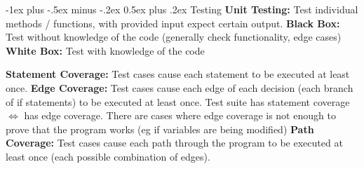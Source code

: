 \documentclass[letterpaper, 8pt]{extarticle}
\makeatletter
\renewcommand{\section}{\@startsection{section}{1}{0mm}%
                                {-1ex plus -.5ex minus -.2ex}%
                                {0.5ex plus .2ex}%
                                {\normalfont\normalsize\bfseries}}
\makeatother
\begin{document}
\begin{multicols*}{6}
  \section{Testing}
  \textbf{Unit Testing:} Test individual methods / functions, with provided input expect certain output.
  \textbf{Black Box:} Test without knowledge of the code (generally check functionality, edge cases)
  \textbf{White Box:} Test with knowledge of the code

  \textbf{Statement Coverage:} Test cases cause each statement to be executed at least once.
  \textbf{Edge Coverage:} Test cases cause each edge of each decision (each branch of if statements) to be executed at least once.
  Test suite has statement coverage $\Leftrightarrow$ has edge coverage.
  There are cases where edge coverage is not enough to prove that the program works
  (eg if variables are being modified)
  \textbf{Path Coverage:} Test cases cause each path through the program to be executed at least once (each possible combination of edges).

\end{multicols*}
\end{document}
